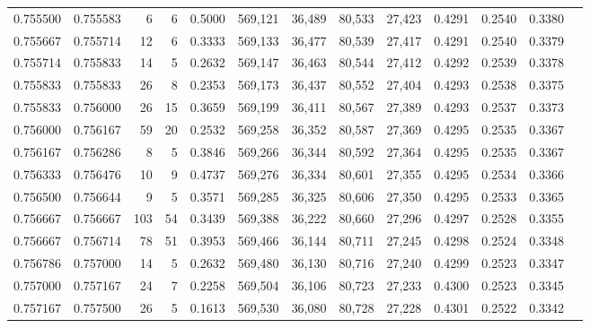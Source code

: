 \begin{tabular}{rrrrrrrrrrrrr}
0.755500 & 0.755583 &     6 &   6 &                                     0.5000 & 569,121 &  36,489 &  80,533 &  27,423 & 0.4291 & 0.2540 & 0.3380 \\
0.755667 & 0.755714 &    12 &   6 &                                     0.3333 & 569,133 &  36,477 &  80,539 &  27,417 & 0.4291 & 0.2540 & 0.3379 \\
0.755714 & 0.755833 &    14 &   5 &                                     0.2632 & 569,147 &  36,463 &  80,544 &  27,412 & 0.4292 & 0.2539 & 0.3378 \\
0.755833 & 0.755833 &    26 &   8 &                                     0.2353 & 569,173 &  36,437 &  80,552 &  27,404 & 0.4293 & 0.2538 & 0.3375 \\
0.755833 & 0.756000 &    26 &  15 &                                     0.3659 & 569,199 &  36,411 &  80,567 &  27,389 & 0.4293 & 0.2537 & 0.3373 \\
0.756000 & 0.756167 &    59 &  20 &                                     0.2532 & 569,258 &  36,352 &  80,587 &  27,369 & 0.4295 & 0.2535 & 0.3367 \\
0.756167 & 0.756286 &     8 &   5 &                                     0.3846 & 569,266 &  36,344 &  80,592 &  27,364 & 0.4295 & 0.2535 & 0.3367 \\
0.756333 & 0.756476 &    10 &   9 &                                     0.4737 & 569,276 &  36,334 &  80,601 &  27,355 & 0.4295 & 0.2534 & 0.3366 \\
0.756500 & 0.756644 &     9 &   5 &                                     0.3571 & 569,285 &  36,325 &  80,606 &  27,350 & 0.4295 & 0.2533 & 0.3365 \\
0.756667 & 0.756667 &   103 &  54 &                                     0.3439 & 569,388 &  36,222 &  80,660 &  27,296 & 0.4297 & 0.2528 & 0.3355 \\
0.756667 & 0.756714 &    78 &  51 &                                     0.3953 & 569,466 &  36,144 &  80,711 &  27,245 & 0.4298 & 0.2524 & 0.3348 \\
0.756786 & 0.757000 &    14 &   5 &                                     0.2632 & 569,480 &  36,130 &  80,716 &  27,240 & 0.4299 & 0.2523 & 0.3347 \\
0.757000 & 0.757167 &    24 &   7 &                                     0.2258 & 569,504 &  36,106 &  80,723 &  27,233 & 0.4300 & 0.2523 & 0.3345 \\
0.757167 & 0.757500 &    26 &   5 &                                     0.1613 & 569,530 &  36,080 &  80,728 &  27,228 & 0.4301 & 0.2522 & 0.3342 \\

\end{tabular}
